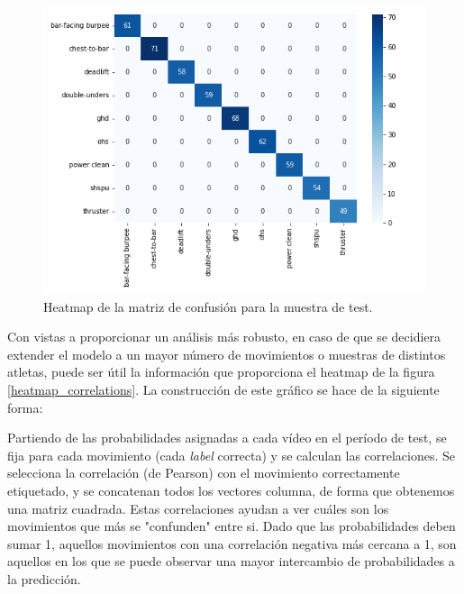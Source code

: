 \begin{figure}[H]
    \centering
		\includegraphics[width=\textwidth]{figs/heatmap_confusion.png}
\caption{Heatmap de la matriz de confusión para la muestra de test.}\label{app_3}
\end{figure}

Con vistas a proporcionar un análisis más robusto, en caso de que se decidiera extender el modelo a un mayor número de movimientos o muestras de distintos atletas, puede ser útil la información que proporciona el heatmap de la figura \ref{heatmap_correlations}. La construcción de este gráfico se hace de la siguiente forma:

Partiendo de las probabilidades asignadas a cada vídeo en el período de test, se fija para cada movimiento (cada \textit{label} correcta) y se calculan las correlaciones. Se selecciona la correlación (de Pearson) con el movimiento correctamente etiquetado, y se concatenan todos los vectores columna, de forma que obtenemos una matriz cuadrada. Estas correlaciones ayudan a ver cuáles son los movimientos que más se "confunden" entre si. Dado que las probabilidades deben sumar 1, aquellos movimientos con una correlación negativa más cercana a 1, son aquellos en los que se puede observar una mayor intercambio de probabilidades a la predicción.

